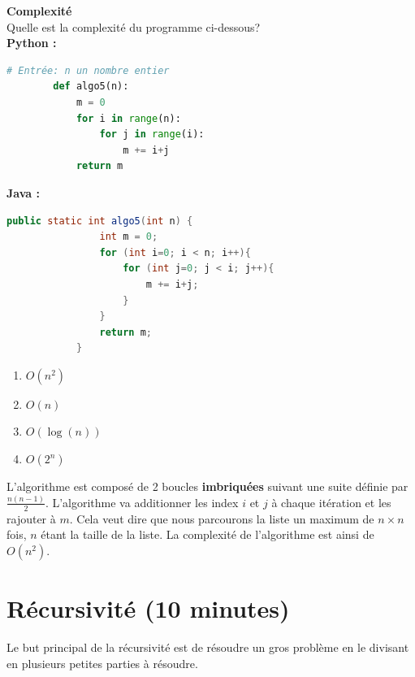 \newpage

\begin{Exercice}[10 minutes] \textbf{Complexité \optionnel} \\
    Quelle est la complexité du programme ci-dessous?\\
        \textbf{Python :}
        \begin{lstlisting}[language=Python]
        # Entrée: n un nombre entier
        def algo5(n):
            m = 0
            for i in range(n):
                for j in range(i):
                    m += i+j
            return m
        \end{lstlisting}
        
        \textbf{Java :}
        \begin{lstlisting}[language=Java]
            public static int algo5(int n) {
                int m = 0;
                for (int i=0; i < n; i++){
                    for (int j=0; j < i; j++){
                        m += i+j;
                    }
                }
                return m;
            }
        \end{lstlisting}
    
        \begin{enumerate}
            \item $O(n^2)$
            \item $O(n)$
            \item $O(\log(n))$
            \item $O(2^n)$
        \end{enumerate}

    \begin{solution} 
    L'algorithme est composé de 2 boucles \textbf{imbriquées} suivant une suite définie par $\frac{n(n-1)}{2}$. L'algorithme va additionner les index $i$ et $j$ à chaque itération et les rajouter à $m$.
    Cela veut dire que nous parcourons la liste un maximum de $n \times n$ fois, $n$ étant la taille de la liste. La complexité de l'algorithme est ainsi de $O(n^2)$.
    \end{solution}
    
\end{Exercice}
    
        
\section{Récursivité (10 minutes)}

Le but principal de la récursivité est de résoudre un gros problème en le divisant en plusieurs petites parties à résoudre.



